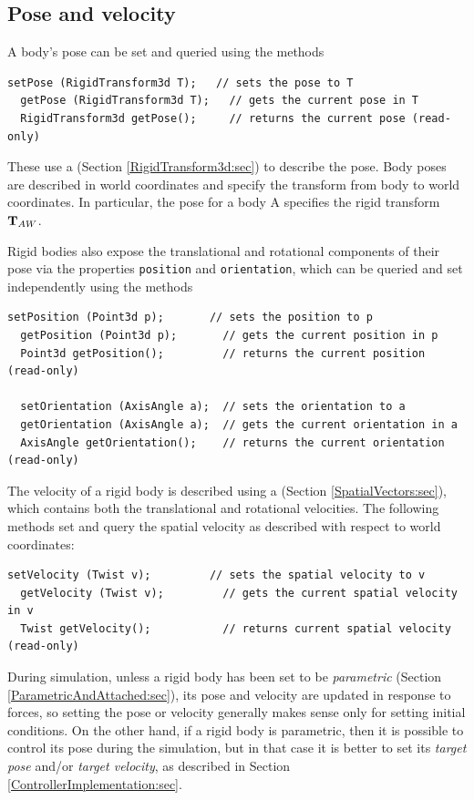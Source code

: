 \subsection{Pose and velocity}

A body's pose can be set and
queried using the methods
\begin{lstlisting}[]
  setPose (RigidTransform3d T);   // sets the pose to T
  getPose (RigidTransform3d T);   // gets the current pose in T
  RigidTransform3d getPose();     // returns the current pose (read-only)
\end{lstlisting}
%
These use a  (Section
\ref{RigidTransform3d:sec}) to describe the pose. Body poses are
described in world coordinates and specify the transform from body to
world coordinates. In particular, the pose for a body A specifies
the rigid transform ${\bf T}_{AW}$.

Rigid bodies also expose the translational and rotational components of
their pose via the properties {\tt position} and {\tt orientation},
which can be queried and set independently using the methods
\begin{lstlisting}[]
  setPosition (Point3d p);       // sets the position to p
  getPosition (Point3d p);       // gets the current position in p
  Point3d getPosition();         // returns the current position (read-only)

  setOrientation (AxisAngle a);  // sets the orientation to a
  getOrientation (AxisAngle a);  // gets the current orientation in a
  AxisAngle getOrientation();    // returns the current orientation (read-only)
\end{lstlisting}
%

The velocity of a rigid body is described using a
 (Section
\ref{SpatialVectors:sec}), which contains both the translational and
rotational velocities. The following methods
set and query the spatial velocity as described with respect to world
coordinates:
\begin{lstlisting}[]
  setVelocity (Twist v);         // sets the spatial velocity to v
  getVelocity (Twist v);         // gets the current spatial velocity in v
  Twist getVelocity();           // returns current spatial velocity (read-only)
\end{lstlisting}
%

During simulation, unless a rigid body has been set to be {\it
parametric} (Section \ref{ParametricAndAttached:sec}), its pose and
velocity are updated in response to forces, so setting the pose or
velocity generally makes sense only for setting initial conditions.
On the other hand, if a rigid body is parametric, then it is possible
to control its pose during the simulation, but in that case it is
better to set its {\it target pose} and/or {\it target velocity}, as
described in Section \ref{ControllerImplementation:sec}.

